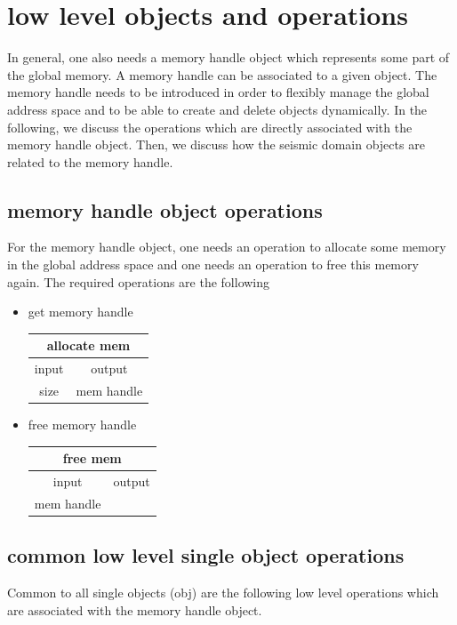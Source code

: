 \documentclass[12pt,a4paper]{article}
\newcommand{\bet}[1]{\begin{center}
		     \begin{tabular}{|c|c|}
		     \hline
		     \multicolumn{2}{|c|}{#1}\\
		     \hline\hline
		     input & output \\
                     \hline}
\newcommand{\eet}{\hline
		  \end{tabular}
		  \end{center}}
\begin{document}
\section{low level objects and operations}

In general, one also needs a memory handle object
which represents some part of the global memory. A memory
handle can be associated to a given object.  
The memory handle needs to be introduced in order to flexibly
manage the global address space and to be able to create and 
delete objects dynamically.  
In the following, we discuss the operations which are directly
associated with the memory handle object. Then, we discuss
how the seismic domain objects are related to the memory handle.

\subsection{memory handle object operations}

For the memory handle object, one needs an operation to allocate some
memory in the global address space and one needs an operation to free
this memory again. The required operations are the following  

\begin{itemize}
\item get memory handle
\bet{allocate mem}
size & mem handle\\
\eet

\item free memory handle
\bet{free mem}
mem handle & \\
\eet

\end{itemize}

\subsection{common low level single object operations}

Common to all single objects (obj) are the following low level operations
which are associated with the memory handle object. 
\end{document}
